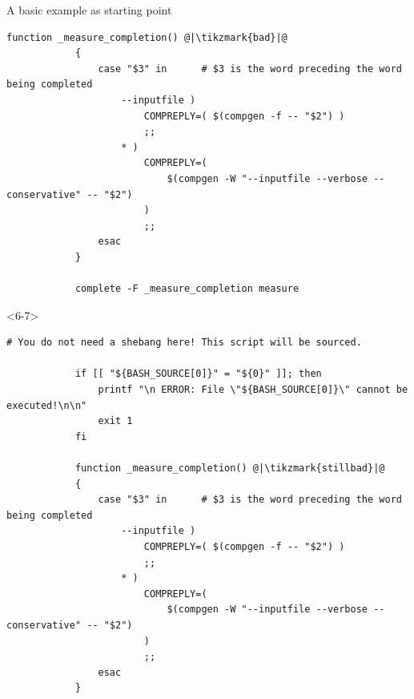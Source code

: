 \begin{frame}[fragile]{A basic example as starting point}
\begin{onlyenv}
\begin{lstlisting}[style=myBash, numbers=none, style=smaller]
            function _measure_completion() @|\tikzmark{bad}|@
            {
                case "$3" in      # $3 is the word preceding the word being completed
                    --inputfile )
                        COMPREPLY=( $(compgen -f -- "$2") )
                        ;;
                    * )
                        COMPREPLY=(
                            $(compgen -W "--inputfile --verbose --conservative" -- "$2")
                        )
                        ;;
                esac
            }

            complete -F _measure_completion measure
        \end{lstlisting}
    \end{onlyenv}
    \begin{onlyenv}<6-7>
            \begin{lstlisting}[style=myBash, numbers=none, style=smaller]
            # You do not need a shebang here! This script will be sourced.

            if [[ "${BASH_SOURCE[0]}" = "${0}" ]]; then
                printf "\n ERROR: File \"${BASH_SOURCE[0]}\" cannot be executed!\n\n"
                exit 1
            fi

            function _measure_completion() @|\tikzmark{stillbad}|@
            {
                case "$3" in      # $3 is the word preceding the word being completed
                    --inputfile )
                        COMPREPLY=( $(compgen -f -- "$2") )
                        ;;
                    * )
                        COMPREPLY=(
                            $(compgen -W "--inputfile --verbose --conservative" -- "$2")
                        )
                        ;;
                esac
            }


\end{lstlisting}
\end{onlyenv}
\end{frame}
